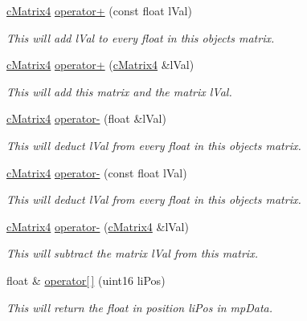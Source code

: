 \begin{DoxyCompactItemize}
\hyperlink{classc_matrix4}{cMatrix4} \hyperlink{classc_matrix4_a10aeb2ece864e892e7a15361b5747a79}{operator+} (const float lVal)
\begin{DoxyCompactList}\small\item\em This will add lVal to every float in this objects matrix. \item\end{DoxyCompactList}\item 
\hyperlink{classc_matrix4}{cMatrix4} \hyperlink{classc_matrix4_a8fa6ac58cb376b1ad4c59eaea1d959bd}{operator+} (\hyperlink{classc_matrix4}{cMatrix4} \&lVal)
\begin{DoxyCompactList}\small\item\em This will add this matrix and the matrix lVal. \item\end{DoxyCompactList}\item 
\hyperlink{classc_matrix4}{cMatrix4} \hyperlink{classc_matrix4_a86c7c478cbcad8c7a6d28837d905ac40}{operator-\/} (float \&lVal)
\begin{DoxyCompactList}\small\item\em This will deduct lVal from every float in this objects matrix. \item\end{DoxyCompactList}\item 
\hyperlink{classc_matrix4}{cMatrix4} \hyperlink{classc_matrix4_a2d89805bd611edabd1732f206f2486fb}{operator-\/} (const float lVal)
\begin{DoxyCompactList}\small\item\em This will deduct lVal from every float in this objects matrix. \item\end{DoxyCompactList}\item 
\hyperlink{classc_matrix4}{cMatrix4} \hyperlink{classc_matrix4_abd270ecc06edf1cfe865bfffbce80ac7}{operator-\/} (\hyperlink{classc_matrix4}{cMatrix4} \&lVal)
\begin{DoxyCompactList}\small\item\em This will subtract the matrix lVal from this matrix. \item\end{DoxyCompactList}\item 
float \& \hyperlink{classc_matrix4_ae6620b907e34e5def3027958cc283528}{operator\mbox{[}$\,$\mbox{]}} (uint16 liPos)
\begin{DoxyCompactList}\small\item\em This will return the float in position liPos in mpData. \item\end{DoxyCompactList}\item 

\end{DoxyCompactItemize}
